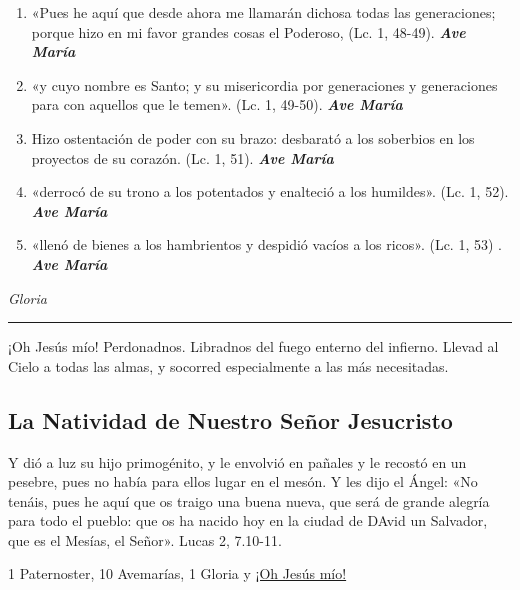 \documentclass[a4paper,11pt, oneside]{report}
\begin{document}
{{\begin{enumerate}
      \item «Pues he aquí que desde ahora me llamarán dichosa todas las generaciones; 
      porque hizo en mi favor grandes cosas el Poderoso, (Lc. 1, 48-49). \textbf{\textit{Ave María}}

      \item «y cuyo nombre es Santo; y su misericordia por generaciones y generaciones para con aquellos que le temen». (Lc. 1, 49-50). \textbf{\textit{Ave María}}

      \item Hizo ostentación de poder con su brazo: desbarató a los soberbios en los proyectos de su corazón. (Lc. 1, 51). \textbf{\textit{Ave María}}

      \item «derrocó de su trono a los potentados y enalteció a los humildes». (Lc. 1, 52). \textbf{\textit{Ave María}}

      \item «llenó de bienes a los hambrientos y despidió vacíos a los ricos». (Lc. 1, 53) . \textbf{\textit{Ave María}}
    \end{enumerate}

    \indent\textit{Gloria}

    \begin{center}\rule{1\linewidth}{\linethickness}\end{center}

    \hypertarget{finalVisitacion}{¡Oh Jesús mío! Perdonadnos. Libradnos del fuego enterno del infierno. Llevad al Cielo a todas las almas, y socorred especialmente a las más 
    necesitadas.}
  }
                      
  \subsection*{La Natividad de Nuestro Señor Jesucristo}
  {

    Y dió a luz su hijo primogénito, y le envolvió en pañales y le recostó en un pesebre, pues no había para ellos lugar en el mesón.
    Y les dijo el Ángel: «No tenáis, pues he aquí que os traigo una buena nueva, que será de grande alegría para todo el pueblo: que os ha nacido hoy en la ciudad de DAvid
    un Salvador, que es el Mesías, el Señor». Lucas 2, 7.10-11.
    
    \medskip
    
    1 Paternoster, 10 Avemarías, 1 Gloria y \hyperlink{finalNatividad}{¡Oh Jesús mío!}
    
}}
\end{document}
